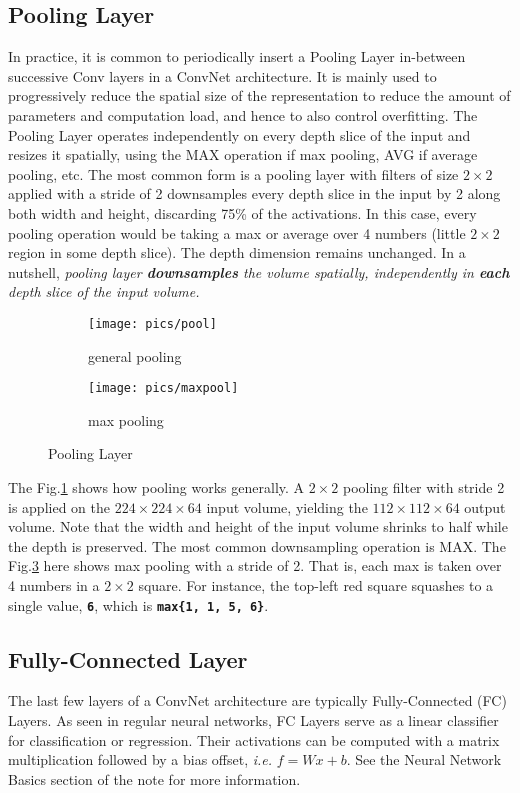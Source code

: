 \documentclass[twoside]{article}
\begin{document}
\subsection{Pooling Layer}
In practice, it is common to periodically insert a Pooling Layer in-between successive Conv layers in a ConvNet architecture. It is mainly used to progressively reduce the spatial size of the representation to reduce the amount of parameters and computation load, and hence to also control overfitting. The Pooling Layer operates independently on every depth slice of the input and resizes it spatially, using the MAX operation if max pooling, AVG if average pooling, etc. The most common form is a pooling layer with filters of size $2\times2$ applied with a stride of 2 downsamples every depth slice in the input by 2 along both width and height, discarding 75\% of the activations. In this case, every pooling operation would be taking a max or average over 4 numbers (little $2\times2$ region in some depth slice). The depth dimension remains unchanged. In a nutshell, \textit{pooling layer \textbf{downsamples} the volume spatially, independently in \textbf{each} depth slice of the input volume.}

\begin{figure}[!htb]
\begin{subfigure}[!htb]{0.45\linewidth}
\texttt{[image: pics/pool]}
\caption{general pooling}
\label{fig:genpool}
\end{subfigure}
\hfill
\begin{subfigure}[!htb]{0.54\linewidth}
\texttt{[image: pics/maxpool]}
\caption{max pooling}
\label{fig:maxpool}
\end{subfigure}
\caption{Pooling Layer\cite{cs231n-website}}
\end{figure}

The Fig.\ref{fig:genpool} shows how pooling works generally. A $2\times2$ pooling filter with stride 2 is applied on the $224\times224\times64$ input volume, yielding the $112\times112\times64$ output volume. Note that the width and height of the input volume shrinks to half while the depth is preserved. The most common downsampling operation is MAX. The Fig.\ref{fig:maxpool} here shows max pooling with a stride of 2. That is, each max is taken over 4 numbers in a $2\times2$ square. For instance, the top-left red square squashes to a single value, \texttt{\textbf{6}}, which is \texttt{\textbf{max\{1, 1, 5, 6\}}}.

\subsection{Fully-Connected Layer}
The last few layers of a ConvNet architecture are typically Fully-Connected (FC) Layers. As seen in regular neural networks, FC Layers serve as a linear classifier for classification or regression. Their activations can be computed with a matrix multiplication followed by a bias offset, \textit{i.e.} $f = Wx + b$. See the Neural Network Basics section of the note for more information.
\end{document}
